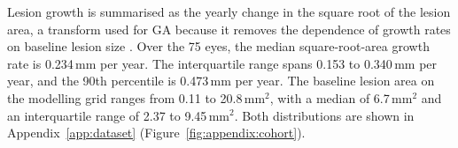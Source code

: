 
Lesion growth is summarised as the yearly change in the square root of
the lesion area, a transform used for GA because it removes the dependence
of growth rates on baseline lesion size \citep{Yehoshua2011,Feuer2013}. Over the 75
eyes, the median square-root-area growth rate is 0.234\,mm per year. The
interquartile range spans 0.153 to 0.340\,mm per year, and the 90th
percentile is 0.473\,mm per year. The baseline lesion area on the
modelling grid ranges from 0.11 to 20.8\,mm$^2$, with a median of
6.7\,mm$^2$ and an interquartile range of 2.37 to 9.45\,mm$^2$. Both
distributions are shown in Appendix~\ref{app:dataset}
(Figure~\ref{fig:appendix:cohort}).

